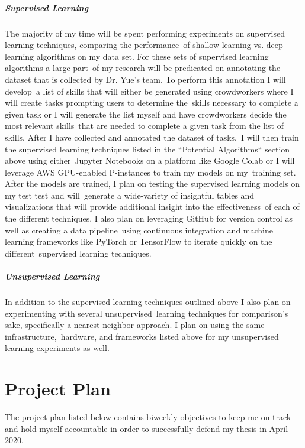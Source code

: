 \documentclass[letterpaper,12pt]{article}
\begin{document}
\paragraph{Supervised Learning}
The majority of my time will be spent performing experiments on supervised learning techniques, comparing the performance\
of shallow learning vs. deep learning algorithms on my data set. For these sets of supervised learning algorithms a large part\
of my research will be predicated on annotating the dataset that is collected by Dr. Yue's team. To perform this annotation I will develop\
a list of skills that will either be generated using crowdworkers where I will create tasks prompting users to determine the\
skills necessary to complete a given task or I will generate the list myself and have crowdworkers decide the most relevant skills\
that are needed to complete a given task from the list of skills. After I have collected and annotated the dataset of tasks,\
I will then train the supervised learning techniques listed in the ``Potential Algorithms`` section above using either\
Jupyter Notebooks on a platform like Google Colab or I will leverage AWS GPU-enabled P-instances to train my models on my\
training set. After the models are trained, I plan on testing the supervised learning models on my test test and will\
generate a wide-variety of insightful tables and visualizations that will provide additional insight into the effectiveness\
of each of the different techniques. I also plan on leveraging GitHub for version control as well as creating a data pipeline\
using continuous integration and machine learning frameworks like PyTorch or TensorFlow to iterate quickly on the different\
supervised learning techniques.

\paragraph{Unsupervised Learning}
In addition to the supervised learning techniques outlined above I also plan on experimenting with several unsupervised\
learning techniques for comparison's sake, specifically a nearest neighbor approach. I plan on using the same infrastructure,\
hardware, and frameworks listed above for my unsupervised learning experiments as well.
\chapter{Project Plan}
The project plan listed below contains biweekly objectives to keep me on track and hold myself accountable in order
to successfully defend my thesis in April 2020.
\end{document}
